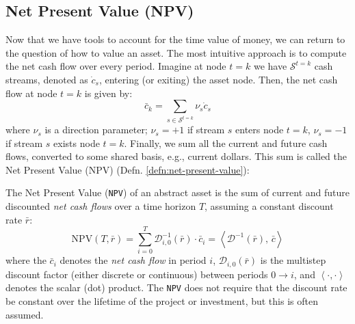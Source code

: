 \documentclass[11pt]{article}
\theoremstyle{definition}
\begin{document}
\subsection{Net Present Value (NPV)}
Now that we have tools to account for the time value of money, we can return to the question of how to value an asset. 
The most intuitive approach is to compute the net cash flow over every period. Imagine at node $t=k$ we have $\mathcal{S}^{t=k}$ cash streams,
denoted as $\dot{c}_{s}$, entering (or exiting) the asset node. 
Then, the net cash flow at node $t=k$ is given by:
\begin{equation}\label{eq:net-cash-flow}
\bar{c}_{k} = \sum_{s\in\mathcal{S}^{t=k}}\nu_{s}\dot{c}_{s}
\end{equation}
where $\nu_{s}$ is a direction parameter; $\nu_{s}=+1$ if stream $s$ enters node $t=k$, $\nu_{s}=-1$ if stream $s$ exists node $t=k$. 
Finally, we sum all the current and future cash flows, converted to some shared basis, e.g., current dollars. 
This sum is called the Net Present Value (NPV) (Defn. \ref{defn:net-present-value}): 
\begin{definition}\label{defn:net-present-value}
The Net Present Value (\texttt{NPV}) of an abstract asset is the sum of current and future discounted \textit{net cash flows} over a time horizon $T$, 
assuming a constant discount rate $\bar{r}$:
\begin{equation}    
\text{NPV}(T, \bar{r}) = \sum_{i=0}^{T}{\mathcal{D}_{i,0}^{-1}}(\bar{r})\cdot\bar{c}_{i} = \left<\mathcal{D}^{-1}(\bar{r}),\,\bar{c}\right>
\end{equation}
where the $\bar{c}_{i}$ denotes the \textit{net cash flow} in period $i$, 
$\mathcal{D}_{i,0}(\bar{r})$ is the multistep discount factor (either discrete or continuous) between periods $0\rightarrow{i}$, and
$\left<\cdot,\cdot\right>$ denotes the scalar (dot) product.
The \texttt{NPV} does not require that the discount rate be constant over the lifetime of the project or investment, 
but this is often assumed.

\end{definition}
\end{document}
